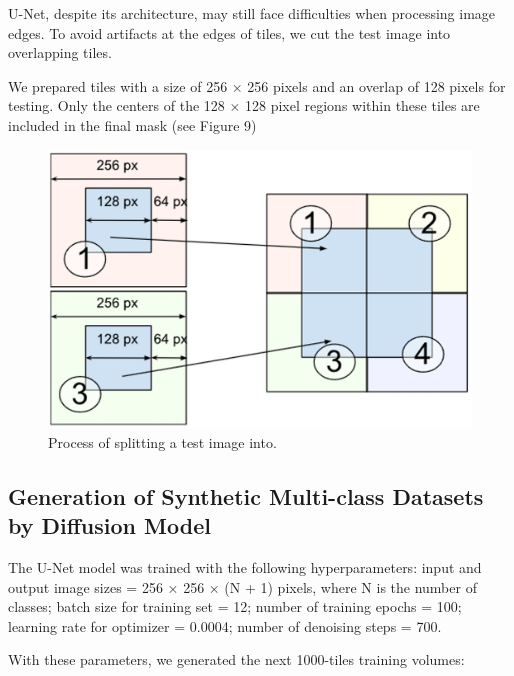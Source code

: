 \documentclass[journal,article,submit,pdftex,moreauthors]{Definitions/mdpi}
\begin{document}
U-Net, despite its architecture, may still face difficulties when processing image edges. To avoid artifacts at the edges of tiles, we cut the test image into overlapping tiles.

We prepared tiles with a size of 256 × 256 pixels and an overlap of 128 pixels for testing. Only the centers of the 128 × 128 pixel regions within these tiles are included in the final mask (see Figure 9)

\begin{figure}[H]
	\includegraphics[width=8 cm]{Definitions/figure-9.png}
	\caption{Process of splitting a test image into.\label{fig9}}
\end{figure}

\subsection{Generation of Synthetic Multi-class Datasets by Diffusion Model}

The U-Net model was trained with the following hyperparameters: input and output image sizes = 256 × 256 × (N + 1) pixels, where N is the number of classes; batch size for training set = 12; number of training epochs = 100; learning rate for optimizer = 0.0004; number of denoising steps = 700.

With these parameters, we generated the next 1000-tiles training volumes:
\end{document}
